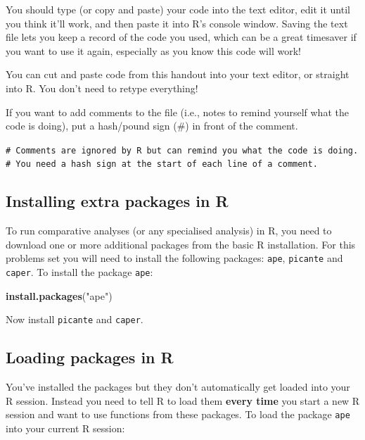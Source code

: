 \documentclass[12pt]{article}
\newcommand{\KeywordTok}[1]{\textcolor[rgb]{0.13,0.29,0.53}{\textbf{{#1}}}}
\newcommand{\StringTok}[1]{\textcolor[rgb]{0.31,0.60,0.02}{{#1}}}
\newcommand{\NormalTok}[1]{{#1}}
\begin{document}
You should type (or copy and paste) your code into the text editor, edit
it until you think it'll work, and then paste it into R's console
window. Saving the text file lets you keep a record of the code you
used, which can be a great timesaver if you want to use it again,
especially as you know this code will work!

\begin{framed}
You can cut and paste code from this handout into your text editor, or straight into R. You don't need to retype everything!
\end{framed}

If you want to add comments to the file (i.e., notes to remind yourself
what the code is doing), put a hash/pound sign (\#) in front of the
comment.

\begin{snugshade}
\texttt{\# Comments are ignored by R but can remind you what the code is doing.\\}
\texttt{\# You need a hash sign at the start of each line of a comment.}
\end{snugshade}

\subsection{Installing extra packages in R}\label{installing-packages}

To run comparative analyses (or any specialised analysis) in R, you need to 
download one or more additional packages from the basic R installation. 
For this problems set you will need to install the following packages: 
\texttt{ape}, \texttt{picante} and \texttt{caper}. 
To install the package \texttt{ape}:

\begin{snugshade}
\begin{Highlighting}[]
\KeywordTok{install.packages}\NormalTok{(}\StringTok{"ape"}\NormalTok{)}
\end{Highlighting}
\end{snugshade}

Now install \texttt{picante} and \texttt{caper}.

\subsection{Loading packages in R}

You've installed the packages but they don't automatically get loaded
into your R session. Instead you need to tell R to load them \textbf{every
time} you start a new R session and want to use functions from these
packages. To load the package \texttt{ape} into your current R session:
\end{document}

